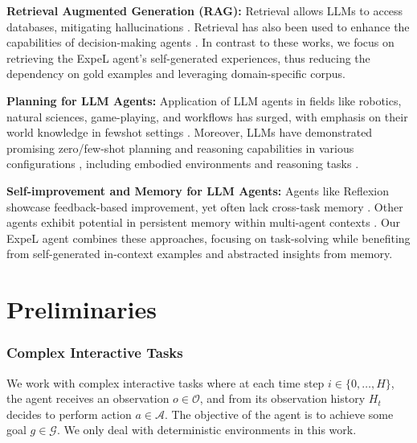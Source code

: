 \documentclass[letterpaper]{article} %
\begin{document}
\noindent\textbf{Retrieval Augmented Generation (RAG):} Retrieval allows LLMs to access databases, mitigating hallucinations \cite{li2022survey,wang2023learning,rubin2021learning,liu2021makes}. Retrieval has also been used to enhance the capabilities of decision-making agents  \cite{humphreys2022large,zhao2023augmenting}. In contrast to these works, we focus on retrieving the ExpeL agent's self-generated experiences, thus reducing the dependency on gold examples and leveraging domain-specific corpus.

\noindent\textbf{Planning for LLM Agents:} Application of LLM agents in fields like robotics, natural sciences, game-playing, and workflows has surged, with emphasis on their world knowledge in fewshot settings \cite{ha2023scaling, mu2023embodiedgpt, bran2023chemcrow, boiko2023emergent, yang2023mm,lin2023swiftsage,nakano2021webgpt,wang2023avalon,liu2023agentbench}. Moreover, LLMs have demonstrated promising zero/few-shot planning and reasoning capabilities in various configurations \cite{sumers2023cognitive}, including embodied environments and reasoning tasks \cite{huang2022language, yao2023tree,wei2022chain, yao2022react,gong2023mindagent}.

\noindent\textbf{Self-improvement and Memory for LLM Agents:} Agents like Reflexion showcase feedback-based improvement, yet often lack cross-task memory \cite{shinn2023reflexion}. Other agents exhibit potential in persistent memory within multi-agent contexts \cite{park2023generative, fable2023showrunner}. Our ExpeL agent combines these approaches, focusing on task-solving while benefiting from self-generated in-context examples and abstracted insights from memory.

\section{Preliminaries}
\subsubsection{Complex Interactive Tasks}
We work with complex interactive tasks where at each time step $i\in\{0,\dots,H\}$, the agent receives an observation $o\in\mathcal{O}$, and from its observation history $H_t$ decides to perform action $a\in\mathcal{A}$. The objective of the agent is to achieve some goal $g\in\mathcal{G}$. We only deal with deterministic environments in this work.
\end{document}
